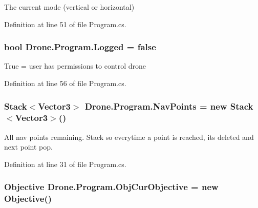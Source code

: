 The current mode (vertical or horizontal) 



Definition at line 51 of file Program.\+cs.

\hypertarget{class_drone_1_1_program_a0456c7157246ae73aed90f2f3b975cb6}{}
\subsubsection[{Logged}]{\setlength{\rightskip}{0pt plus 5cm}bool Drone.\+Program.\+Logged = false\hspace{0.3cm}{\ttfamily [static]}}\label{class_drone_1_1_program_a0456c7157246ae73aed90f2f3b975cb6}


True = user has permissions to control drone 



Definition at line 56 of file Program.\+cs.

\hypertarget{class_drone_1_1_program_ad40ef1f4efb2b65d600ab10634066735}{}
\subsubsection[{Nav\+Points}]{\setlength{\rightskip}{0pt plus 5cm}Stack$<$Vector3$>$ Drone.\+Program.\+Nav\+Points = new Stack$<$Vector3$>$()\hspace{0.3cm}{\ttfamily [static]}}\label{class_drone_1_1_program_ad40ef1f4efb2b65d600ab10634066735}


All nav points remaining. Stack so everytime a point is reached, it\textquotesingle{}s deleted and next point pop. 



Definition at line 31 of file Program.\+cs.

\hypertarget{class_drone_1_1_program_aff66fb52ebe59fd675ca624f522d7cf1}{}
\subsubsection[{Obj\+Cur\+Objective}]{\setlength{\rightskip}{0pt plus 5cm}Objective Drone.\+Program.\+Obj\+Cur\+Objective = new Objective()\hspace{0.3cm}{\ttfamily [static]}}\label{class_drone_1_1_program_aff66fb52ebe59fd675ca624f522d7cf1}


